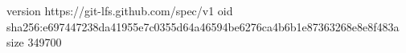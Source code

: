 version https://git-lfs.github.com/spec/v1
oid sha256:e697447238da41955e7c0355d64a46594be6276ca4b6b1e87363268e8e8f483a
size 349700
